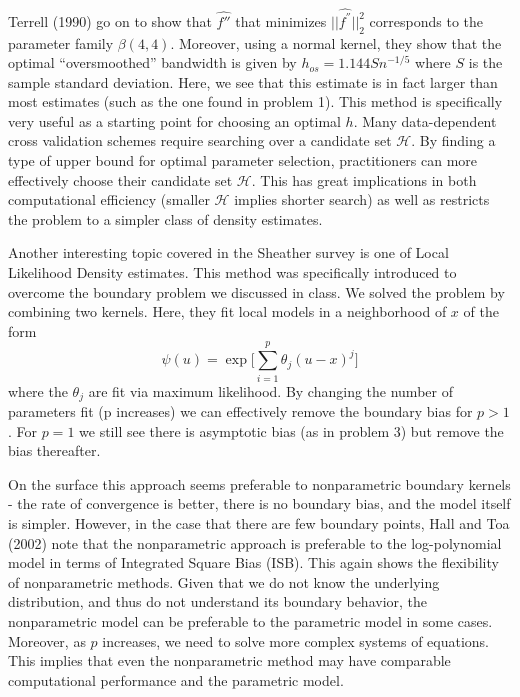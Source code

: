 \documentclass[12pt]{article}  %
\begin{document}
\begin{enumerate}
Terrell (1990) go on to show that $\hat{f''}$ that minimizes $||\hat{f^{''}}||_2^2$ corresponds to the parameter family $\beta(4,4)$. Moreover, using a normal kernel, they show that the optimal ``oversmoothed'' bandwidth is given by $h_{os} = 1.144Sn^{-1/5}$ where $S$ is the sample standard deviation. Here, we see that this estimate is in fact larger than most estimates (such as the one found in problem 1). This method is specifically very useful as a starting point for choosing an optimal $h$. Many data-dependent cross validation schemes require searching over a candidate set $\mathcal{H}$. By finding a type of upper bound for optimal parameter selection, practitioners can more effectively choose their candidate set $\mathcal{H}$. This has great implications in both computational efficiency (smaller $\mathcal{H}$ implies shorter search) as well as restricts the problem to a simpler class of density estimates. 

Another interesting topic covered in the Sheather survey is one of Local Likelihood Density estimates. This method was specifically introduced to overcome the boundary problem we discussed in class. We solved the problem by combining two kernels. Here, they fit local models in a neighborhood of $x$ of the form $$\psi(u) = \exp\Big[\sum_{i=1}^{p}\theta_j(u-x)^{j}\Big]$$ where the $\theta_j$ are fit via maximum likelihood. By changing the number of parameters fit (p increases) we can effectively remove the boundary bias for $p>1$. For $p=1$ we still see there is asymptotic bias (as in problem 3) but remove the bias thereafter. 

On the surface this approach seems preferable to nonparametric boundary kernels - the rate of convergence is better, there is no boundary bias, and the model itself is simpler. However, in the case that there are few boundary points, Hall and Toa (2002) note that the nonparametric approach is preferable to the log-polynomial model in terms of Integrated Square Bias (ISB). This again shows the flexibility of nonparametric methods. Given that we do not know the underlying distribution, and thus do not understand its boundary behavior, the nonparametric model can be preferable to the parametric model in some cases. Moreover, as $p$ increases, we need to solve more complex systems of equations. This implies that even the nonparametric method may have comparable computational performance and the parametric model. 



\end{enumerate}
\end{document}
